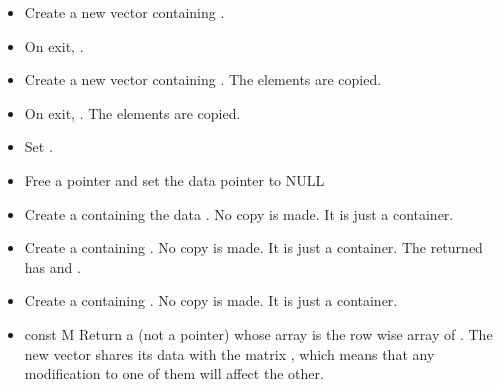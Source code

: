 \begin{itemize}
\item {}
  \sshortdescribe Create a new vector containing .

\item {}
  \sshortdescribe On exit, .

\item {}
  \sshortdescribe Create a new vector containing . The
  elements are copied.
  
\item {}
  \sshortdescribe On exit, .  The
  elements are copied.

\item {}
  \sshortdescribe Set .

\item {}
  \sshortdescribe Free a \PnlVect pointer and set the data pointer to NULL  
\item {}
    \sshortdescribe Create a \PnlVect containing the data 
  . No copy is made. It is just a container.
  
\item {}
  \sshortdescribe Create a \PnlVect containing
  . No copy is made. It is just a container. The returned
  \PnlVect has  and .

\item {}
  \sshortdescribe Create a \PnlVect containing . No
  copy is made. It is just a container.

\item {}
  {const \PnlMat \ptr M}
  \sshortdescribe Return a \PnlVect (not a pointer) whose array is
  the row wise array of . The new vector shares its data with the
  matrix , which means that any modification to one of them will affect
  the other.
\end{itemize}

